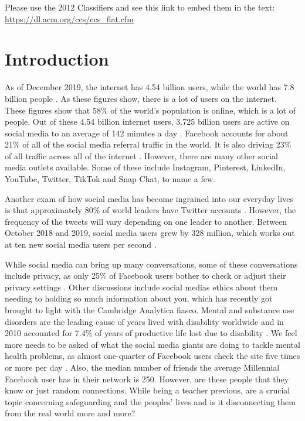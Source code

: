 \documentclass{sigchi}
\begin{document}
\printccsdesc
Please use the 2012 Classifiers and see this link to embed them in the text: \url{https://dl.acm.org/ccs/ccs_flat.cfm}



\section{Introduction}
	As of December 2019, the internet has 4.54 billion users, while the world has 7.8 billion people \cite{126_sm_facts}. As these figures show, there is a lot of users on the internet. These figures show that 58\% of the world's population is online, which is a lot of people. Out of these 4.54 billion internet users, 3.725 billion users are active on social media to an average of 142 minutes a day \cite{126_sm_facts}. Facebook accounts for about 21\% of all of the social media referral traffic in the world. It is also driving 23\% of all traffic across all of the internet \cite{47_sm_facts, 126_sm_facts}. However, there are many other social media outlets available. Some of these include Instagram, Pinterest, LinkedIn, YouTube, Twitter, TikTok and Snap Chat, to name a few.
	
	Another exam of how social media has become ingrained into our everyday lives is that approximately 80\% of world leaders have Twitter accounts \cite{47_sm_facts}. However, the frequency of the tweets will vary depending on one leader to another. Between October 2018 and 2019, social media users grew by 328 million, which works out at ten new social media users per second \cite{126_sm_facts}.
	
	While social media can bring up many conversations, some of these conversations include privacy, as only 25\% of Facebook users bother to check or adjust their privacy settings \cite{47_sm_facts}. Other discussions include social medias ethics about them needing to holding so much information about you, which has recently got brought to light with the Cambridge Analytica fiasco. Mental and substance use disorders are the leading cause of years lived with disability worldwide and in 2010 accounted for 7.4\% of years of productive life lost due to disability \cite{gkotsis2017characterisation}. We feel more needs to be asked of what the social media giants are doing to tackle mental health problems, as almost one-quarter of Facebook users check the site five times or more per day \cite{47_sm_facts}. Also, the median number of friends the average Millennial Facebook user has in their network is 250. However, are these people that they know or just random connections. While being a teacher previous, are a crucial topic concerning safeguarding and the peoples' lives and is it disconnecting them from the real world more and more?
	
\end{document}
